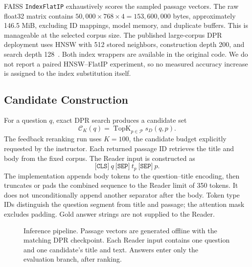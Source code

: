 FAISS \texttt{IndexFlatIP} exhaustively scores the sampled passage vectors. The raw float32 matrix contains $50{,}000\times768\times4=153{,}600{,}000$ bytes, approximately 146.5 MiB, excluding ID mappings, model memory, and duplicate buffers. This is manageable at the selected corpus size. The published large-corpus DPR deployment uses HNSW with 512 stored neighbors, construction depth 200, and search depth 128~\cite{dpr}. Both index wrappers are available in the original code. We do not report a paired HNSW--FlatIP experiment, so no measured accuracy increase is assigned to the index substitution itself.

\subsection{Candidate Construction}
For a question $q$, exact DPR search produces a candidate set
\begin{equation}
\mathcal{C}_K(q)=\operatorname{TopK}_{p\in\mathcal{P}}s_D(q,p).
\end{equation}
The feedback reranking run uses $K=100$, the candidate budget explicitly requested by the instructor. Each returned passage ID retrieves the title and body from the fixed corpus. The Reader input is constructed as
\begin{equation}
\texttt{[CLS]}\ q\ \texttt{[SEP]}\ t_p\ \texttt{[SEP]}\ p.
\end{equation}
The implementation appends body tokens to the question--title encoding, then truncates or pads the combined sequence to the Reader limit of 350 tokens. It does not unconditionally append another separator after the body. Token type IDs distinguish the question segment from title and passage; the attention mask excludes padding. Gold answer strings are not supplied to the Reader.

\begin{figure}[t]
\centering

\caption{Inference pipeline. Passage vectors are generated offline with the matching DPR checkpoint. Each Reader input contains one question and one candidate's title and text. Answers enter only the evaluation branch, after ranking.}
\label{fig:pipeline}
\end{figure}

